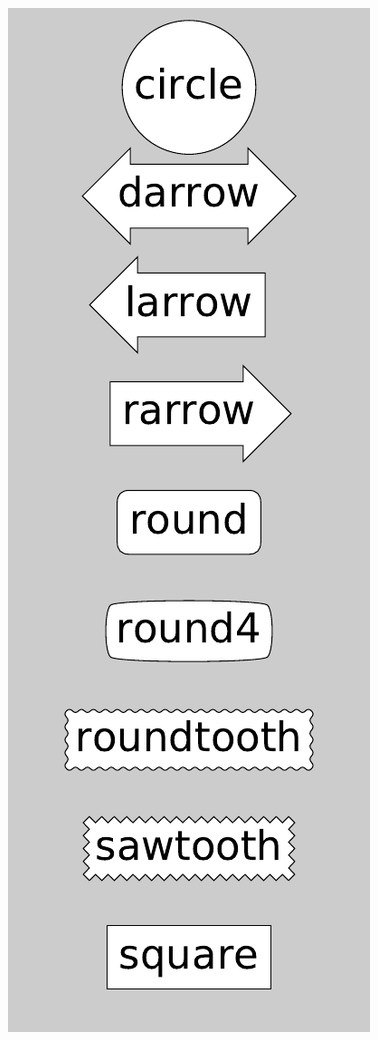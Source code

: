 \documentclass[UTF8,a4paper,12pt]{ctexart}  %
\begin{document}
\begin{center}\includegraphics[width=0.9\linewidth]{python-visualization_files/figure-latex/unnamed-chunk-54-1} \end{center}
\end{document}
